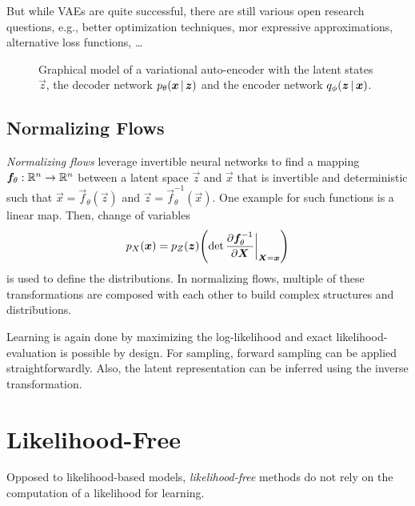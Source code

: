 			But while VAEs are quite successful, there are still various open research questions, e.g., better optimization techniques, mor expressive approximations, alternative loss functions, \dots

			\begin{figure}
				\centering
				\caption[Variational Auto-Encoder]{Graphical model of a variational auto-encoder with the latent states \(\vec{z}\), the decoder network \(p_\theta(\bm{x} \,\vert\, \bm{z})\) and the encoder network \(q_\phi(\bm{z} \,\vert\, \bm{x})\).}
				\label{fig:vae}
			\end{figure}

		\subsection{Normalizing Flows}
			\emph{Normalizing flows} leverage invertible neural networks to find a mapping \( \bm{f}_\theta : \mathbb{R}^n \to \mathbb{R}^n \) between a latent space \(\vec{z}\) and \(\vec{x}\) that is invertible and deterministic such that \( \vec{x} = \vec{f}_\theta(\vec{z}) \) and \( \vec{z} = \vec{f}_\theta^{-1}(\vec{x}) \). One example for such functions is a linear map. Then, change of variables
			\begin{equation}
				p_X(\bm{x}) = p_Z(\bm{z}) \Biggl( \det \pdv{\bm{f}_\theta^{-1}}{\bm{X}} \bigg\vert_{\bm{X} = \bm{x}} \Biggr)
			\end{equation}
			is used to define the distributions. In normalizing flows, multiple of these transformations are composed with each other to build complex structures and distributions.

			Learning is again done by maximizing the log-likelihood and exact likelihood-evaluation is possible by design. For sampling, forward sampling can be applied straightforwardly. Also, the latent representation can be inferred using the inverse transformation.

	\section{Likelihood-Free}
		Opposed to likelihood-based models, \emph{likelihood-free} methods do not rely on the computation of a likelihood for learning.

